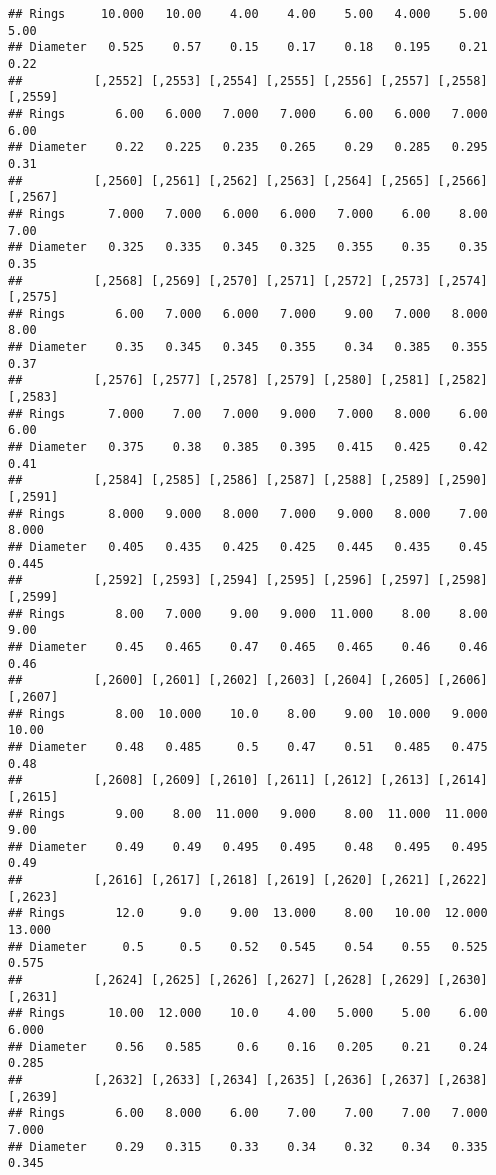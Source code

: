 \documentclass[
]{article}
\begin{document}
\begin{verbatim}
## Rings     10.000   10.00    4.00    4.00    5.00   4.000    5.00    5.00
## Diameter   0.525    0.57    0.15    0.17    0.18   0.195    0.21    0.22
##          [,2552] [,2553] [,2554] [,2555] [,2556] [,2557] [,2558] [,2559]
## Rings       6.00   6.000   7.000   7.000    6.00   6.000   7.000    6.00
## Diameter    0.22   0.225   0.235   0.265    0.29   0.285   0.295    0.31
##          [,2560] [,2561] [,2562] [,2563] [,2564] [,2565] [,2566] [,2567]
## Rings      7.000   7.000   6.000   6.000   7.000    6.00    8.00    7.00
## Diameter   0.325   0.335   0.345   0.325   0.355    0.35    0.35    0.35
##          [,2568] [,2569] [,2570] [,2571] [,2572] [,2573] [,2574] [,2575]
## Rings       6.00   7.000   6.000   7.000    9.00   7.000   8.000    8.00
## Diameter    0.35   0.345   0.345   0.355    0.34   0.385   0.355    0.37
##          [,2576] [,2577] [,2578] [,2579] [,2580] [,2581] [,2582] [,2583]
## Rings      7.000    7.00   7.000   9.000   7.000   8.000    6.00    6.00
## Diameter   0.375    0.38   0.385   0.395   0.415   0.425    0.42    0.41
##          [,2584] [,2585] [,2586] [,2587] [,2588] [,2589] [,2590] [,2591]
## Rings      8.000   9.000   8.000   7.000   9.000   8.000    7.00   8.000
## Diameter   0.405   0.435   0.425   0.425   0.445   0.435    0.45   0.445
##          [,2592] [,2593] [,2594] [,2595] [,2596] [,2597] [,2598] [,2599]
## Rings       8.00   7.000    9.00   9.000  11.000    8.00    8.00    9.00
## Diameter    0.45   0.465    0.47   0.465   0.465    0.46    0.46    0.46
##          [,2600] [,2601] [,2602] [,2603] [,2604] [,2605] [,2606] [,2607]
## Rings       8.00  10.000    10.0    8.00    9.00  10.000   9.000   10.00
## Diameter    0.48   0.485     0.5    0.47    0.51   0.485   0.475    0.48
##          [,2608] [,2609] [,2610] [,2611] [,2612] [,2613] [,2614] [,2615]
## Rings       9.00    8.00  11.000   9.000    8.00  11.000  11.000    9.00
## Diameter    0.49    0.49   0.495   0.495    0.48   0.495   0.495    0.49
##          [,2616] [,2617] [,2618] [,2619] [,2620] [,2621] [,2622] [,2623]
## Rings       12.0     9.0    9.00  13.000    8.00   10.00  12.000  13.000
## Diameter     0.5     0.5    0.52   0.545    0.54    0.55   0.525   0.575
##          [,2624] [,2625] [,2626] [,2627] [,2628] [,2629] [,2630] [,2631]
## Rings      10.00  12.000    10.0    4.00   5.000    5.00    6.00   6.000
## Diameter    0.56   0.585     0.6    0.16   0.205    0.21    0.24   0.285
##          [,2632] [,2633] [,2634] [,2635] [,2636] [,2637] [,2638] [,2639]
## Rings       6.00   8.000    6.00    7.00    7.00    7.00   7.000   7.000
## Diameter    0.29   0.315    0.33    0.34    0.32    0.34   0.335   0.345

\end{verbatim}
\end{document}
